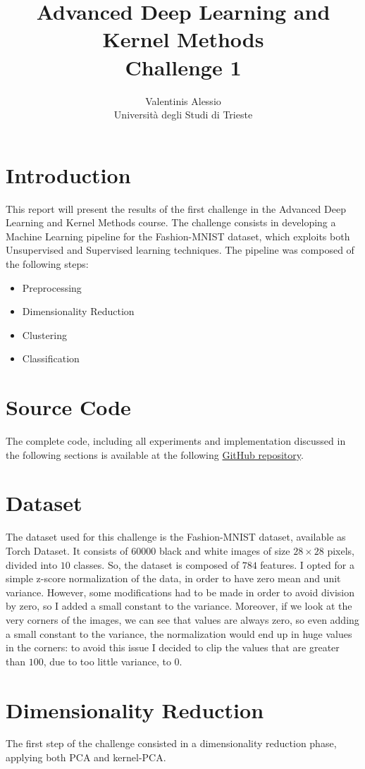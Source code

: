 \documentclass[a4paper, 10pt]{article}
\title{Advanced Deep Learning and Kernel Methods \\ Challenge 1}
\author{Valentinis Alessio\\Università degli Studi di Trieste}
\date{}
\begin{document}
\maketitle

\section{Introduction}
This report will present the results of the first challenge in the Advanced Deep Learning and Kernel Methods course.
The challenge consists in developing a Machine Learning pipeline for the Fashion-MNIST dataset, which exploits both
Unsupervised and Supervised learning techniques. The pipeline was composed of the following steps:
\begin{itemize}
    \item Preprocessing
    \item Dimensionality Reduction
    \item Clustering
    \item Classification
\end{itemize}

\section{Source Code}
The complete code, including all experiments and implementation discussed in the following sections
is available at the following \href{https://github.com/ValentinisAlessio/Adv_DL_challenges}{GitHub repository}.

\section{Dataset}
The dataset used for this challenge is the Fashion-MNIST dataset, available as Torch Dataset. It consists of $60000$
black and white images of size $28 \times 28$ pixels, divided into $10$ classes. So, the dataset is composed of $784$ features.
I opted for a simple z-score normalization of the data, in order to have zero mean and unit variance. However, some modifications had to be made
in order to avoid division by zero, so I added a small constant to the variance. Moreover, if we look at the very corners of the images, we can see that
values are always zero, so even adding a small constant to the variance, the normalization would end up in huge values in the corners: to avoid this issue
I decided to clip the values that are greater than $100$, due to too little variance, to $0$.

\section{Dimensionality Reduction}
The first step of the challenge consisted in a dimensionality reduction phase, applying both PCA and kernel-PCA.
\end{document}
